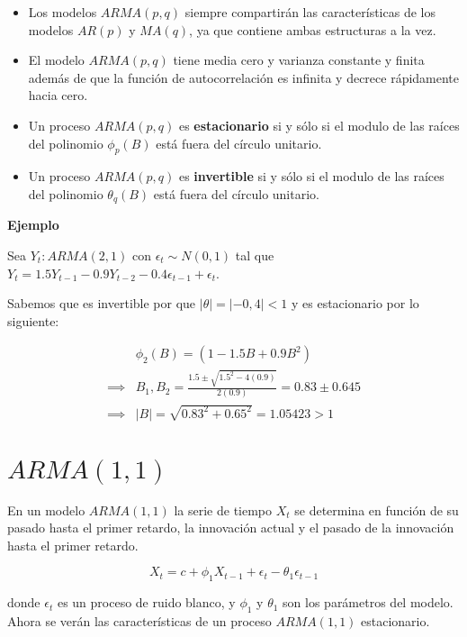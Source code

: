 \documentclass[
  a4paper,
  oneside,
  openany]{book}
\providecommand{\tightlist}{%
  \setlength{\itemsep}{0pt}\setlength{\parskip}{0pt}}
\begin{document}
\begin{itemize}
\tightlist
\item
  Los modelos \(ARMA(p,q)\) siempre compartirán las características de los modelos \(AR(p)\) y \(MA(q)\), ya que contiene ambas estructuras a la vez.
\item
  El modelo \(ARMA(p,q)\) tiene media cero y varianza constante y finita además de que la función de autocorrelación es infinita y decrece rápidamente hacia cero.\\
\item
  Un proceso \(ARMA(p,q)\) es \textbf{estacionario} si y sólo si el modulo de las raíces del polinomio \(\phi_p(B)\) está fuera del círculo unitario.
\item
  Un proceso \(ARMA(p,q)\) es \textbf{invertible} si y sólo si el modulo de las raíces del polinomio \(\theta_q(B)\) está fuera del círculo unitario.
\end{itemize}

\textbf{Ejemplo}

Sea \(Y_t: ARMA(2,1)\) con \(\epsilon_t\sim N(0,1)\) tal que \(Y_t = 1.5Y_{t-1}-0.9Y_{t-2}-0.4\epsilon_{t-1}+\epsilon_t\).

Sabemos que es invertible por que \(|\theta| = |-0,4|<1\) y es estacionario por lo siguiente:

\[
\begin{split}
&\phi_2(B) = (1-1.5B+0.9B^2)\\
\implies & B_1, B_2 = \frac{1.5\pm\sqrt{1.5^2-4(0.9)}}{2(0.9)} = 0.83\pm0.645\\
\implies & |B| = \sqrt{0.83^2+0.65^2} = 1.05423 > 1
\end{split}
\]

\hypertarget{arma11}{%
\section{\texorpdfstring{\(ARMA(1,1)\)}{ARMA(1,1)}}\label{arma11}}

En un modelo \(ARMA(1,1)\) la serie de tiempo \(X_t\) se determina en función de su pasado hasta el primer retardo, la innovación actual y el pasado de la innovación hasta el primer retardo.

\[
X_t=c+ \phi_1X_{t-1}+\epsilon_t-\theta_1\epsilon_{t-1}
\]

donde \(\epsilon_t\) es un proceso de ruido blanco, y \(\phi_1\) y \(\theta_1\) son los parámetros del modelo. Ahora se verán las características de un proceso \(ARMA(1,1)\) estacionario.
\end{document}
